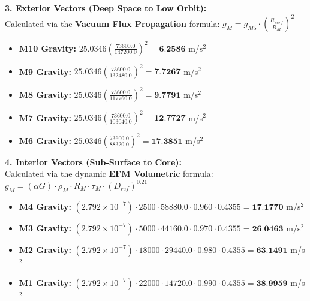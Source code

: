 \documentclass[11pt, a4paper]{article}
\begin{document}
  \clearpage
  \noindent \textbf{3. Exterior Vectors (Deep Space to Low Orbit):} \\
  \hspace*{1em} Calculated via the \textbf{Vacuum Flux Propagation} formula: $g_M = g_{M5} \cdot \left( \frac{R_{surf}}{R_M} \right)^2$
  \begin{itemize}
    \item \textbf{M10 Gravity:} $25.0346 \left( \frac{73600.0}{147200.0} \right)^2 = \textbf{6.2586}$ m/s$^2$
    \item \textbf{M9 Gravity:} $25.0346 \left( \frac{73600.0}{132480.0} \right)^2 = \textbf{7.7267}$ m/s$^2$
    \item \textbf{M8 Gravity:} $25.0346 \left( \frac{73600.0}{117760.0} \right)^2 = \textbf{9.7791}$ m/s$^2$
    \item \textbf{M7 Gravity:} $25.0346 \left( \frac{73600.0}{103040.0} \right)^2 = \textbf{12.7727}$ m/s$^2$
    \item \textbf{M6 Gravity:} $25.0346 \left( \frac{73600.0}{88320.0} \right)^2 = \textbf{17.3851}$ m/s$^2$
  \end{itemize}

  \vspace{0.5em}
  \noindent \textbf{4. Interior Vectors (Sub-Surface to Core):} \\[0.5em]
  \hspace*{1em} Calculated via the dynamic \textbf{EFM Volumetric} formula: $g_M = (\alpha G) \cdot \rho_{M} \cdot R_M \cdot \tau_M \cdot (D_{ref})^{0.21}$
  \begin{itemize}
    \item \textbf{M4 Gravity:} $(2.792 \times 10^{-7}) \cdot 2500 \cdot 58880.0 \cdot 0.960 \cdot 0.4355 = \textbf{17.1770}$ m/s$^2$
    \item \textbf{M3 Gravity:} $(2.792 \times 10^{-7}) \cdot 5000 \cdot 44160.0 \cdot 0.970 \cdot 0.4355 = \textbf{26.0463}$ m/s$^2$
    \item \textbf{M2 Gravity:} $(2.792 \times 10^{-7}) \cdot 18000 \cdot 29440.0 \cdot 0.980 \cdot 0.4355 = \textbf{63.1491}$ m/s$^2$
    \item \textbf{M1 Gravity:} $(2.792 \times 10^{-7}) \cdot 22000 \cdot 14720.0 \cdot 0.990 \cdot 0.4355 = \textbf{38.9959}$ m/s$^2$
  \end{itemize}
\end{document}

